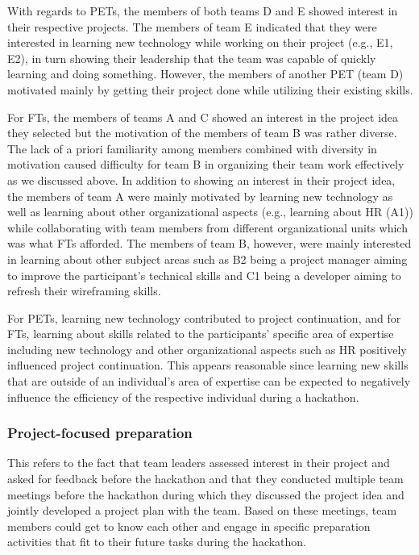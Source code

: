 \documentclass{hcij}
\begin{document}
With regards to PETs, the members of both teams D and E showed interest in their respective projects. The members of team E indicated that they were interested in learning new technology while working on their project (e.g., E1, E2), in turn showing their leadership that the team was capable of quickly learning and doing something. However, the members of another PET (team D) motivated mainly by getting their project done while utilizing their existing skills.

For FTs, the members of teams A and C showed an interest in the project idea they selected but the motivation of the members of team B was rather diverse. The lack of a priori familiarity among members combined with diversity in motivation caused difficulty for team B in organizing their team work effectively as we discussed above. In addition to showing an interest in their project idea, the members of team A were mainly motivated by learning new technology as well as learning about other organizational aspects (e.g., learning about HR (A1)) while collaborating with team members from different organizational units which was what FTs afforded. The members of team B, however, were mainly interested in learning about other subject areas such as B2 being a project manager aiming to improve the participant’s technical skills and C1 being a developer aiming to refresh their wireframing skills.

For PETs, learning new technology contributed to project continuation, and for FTs, learning about skills related to the participants’ specific area of expertise including new technology and other organizational aspects such as HR positively influenced project continuation. This appears reasonable since learning new skills that are outside of an individual’s area of expertise can be expected to negatively influence the efficiency of the respective individual during a hackathon.

\subsubsection{Project-focused preparation}
This refers to the fact that team leaders assessed interest in their project and asked for feedback before the hackathon and that they conducted multiple team meetings before the hackathon during which they discussed the project idea and jointly developed a project plan with the team. Based on these meetings, team members could get to know each other and engage in specific preparation activities that fit to their future tasks during the hackathon.
\end{document}
